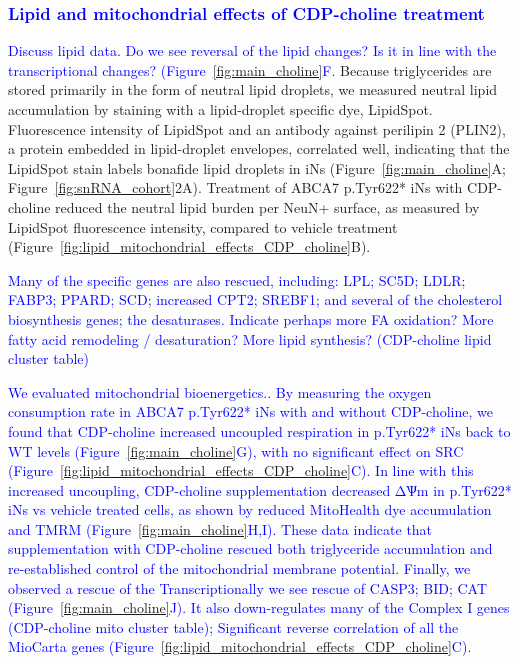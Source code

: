 \subsubsection{\textcolor{blue}{Lipid and mitochondrial effects of CDP-choline treatment}}
\textcolor{blue}{Discuss lipid data. Do we see reversal of the lipid changes? Is it in line with the transcriptional changes? (Figure~\ref{fig:main_choline}F}. Because triglycerides are stored primarily in the form of neutral lipid droplets\cite{noauthor_2024-sd}, we measured neutral lipid accumulation by staining with a lipid-droplet specific dye, LipidSpot. Fluorescence intensity of  LipidSpot and an antibody against perilipin 2 (PLIN2), a protein embedded in lipid-droplet envelopes\cite{Olzmann2019-qv}, correlated well, indicating that the LipidSpot stain labels bonafide lipid droplets in iNs (Figure~\ref{fig:main_choline}A; Figure~\ref{fig:snRNA_cohort}2A). Treatment of ABCA7 p.Tyr622* iNs with CDP-choline reduced the neutral lipid burden per NeuN+ surface, as measured by LipidSpot fluorescence intensity, compared to vehicle treatment (Figure~\ref{fig:lipid_mitochondrial_effects_CDP_choline}B). \textcolor{blue}{Many of the specific genes are also rescued, including:  LPL; SC5D; LDLR; FABP3; PPARD; SCD; increased CPT2; SREBF1; and several of the cholesterol biosynthesis genes; the desaturases. Indicate perhaps more FA oxidation? More fatty acid remodeling / desaturation? More lipid synthesis? \textcolor{blue}{(CDP-choline lipid cluster table)} 

\textcolor{blue}{We evaluated mitochondrial bioenergetics.}. By measuring the oxygen consumption rate in ABCA7 p.Tyr622* iNs with and without CDP-choline, we found that CDP-choline increased uncoupled respiration in p.Tyr622* iNs back to WT levels (Figure~\ref{fig:main_choline}G), with no significant effect on SRC (Figure~\ref{fig:lipid_mitochondrial_effects_CDP_choline}C). In line with this increased uncoupling, CDP-choline supplementation decreased ΔѰm in p.Tyr622* iNs vs vehicle treated cells, as shown by reduced MitoHealth dye accumulation and TMRM (Figure~\ref{fig:main_choline}H,I). These data indicate that supplementation with CDP-choline rescued both triglyceride accumulation and re-established control of the mitochondrial membrane potential. \textcolor{blue}{Finally, we observed a rescue of the Transcriptionally we see rescue of CASP3; BID; CAT (Figure~\ref{fig:main_choline}J). It also down-regulates many of the Complex I genes \textcolor{blue}{(CDP-choline mito cluster table)}; Significant reverse correlation of all the MioCarta genes (Figure~\ref{fig:lipid_mitochondrial_effects_CDP_choline}C)}.

}
